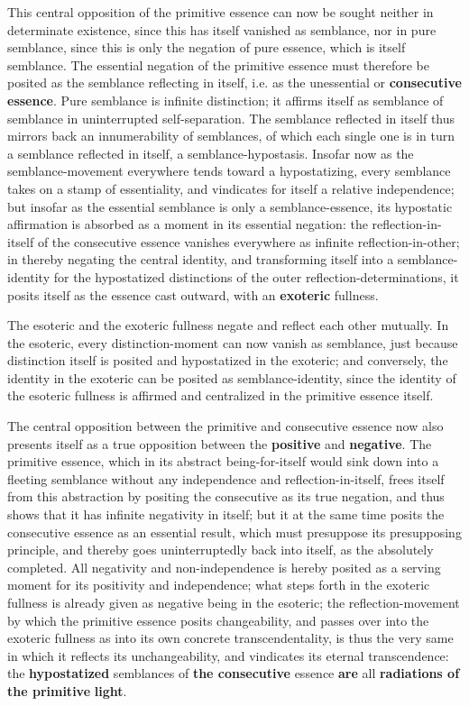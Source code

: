 \documentclass[12pt,a4paper,openany]{book}
\newcommand{\opage}[1]{\marginnote{\footnotesize\textit{[#1]}}}
\begin{document}
This central opposition of the primitive essence can now be sought neither in determinate existence, since this has itself vanished as semblance, nor in pure semblance, since this is only the negation of pure essence, which is itself semblance. The essential negation of the primitive essence must therefore be posited as the semblance reflecting in itself, i.e. as the unessential or \textbf{consecutive essence}.
\setcounter{footnote}{0}%
\opage{120}Pure semblance is infinite distinction; it affirms
itself as semblance of semblance in uninterrupted self-separation.
The semblance reflected in itself thus mirrors back
an innumerability of semblances, of which each single one
is in turn a semblance reflected in itself, a semblance-hypostasis.
Insofar now as the semblance-movement everywhere tends
toward a hypostatizing, every semblance takes on a stamp of essentiality,
and vindicates for itself a relative independence;
but insofar as the essential semblance
is only a semblance-essence, its hypostatic
affirmation is absorbed as a moment in its essential negation:
the reflection-in-itself of the consecutive essence vanishes
everywhere as infinite reflection-in-other;
in thereby negating the central identity, and
transforming itself into a semblance-identity for the hypostatized
distinctions of the outer reflection-determinations, it posits
itself as the essence cast outward, with an \textbf{exoteric}
fullness.

The esoteric and the exoteric fullness negate and
reflect each other mutually. In the esoteric,
every distinction-moment can now vanish as semblance,
just because distinction itself is posited and hypostatized
in the exoteric; and conversely, the identity in the
exoteric can be posited as semblance-identity, since the identity
of the esoteric fullness is affirmed and centralized
in the primitive essence itself.

The central opposition between the primitive and
consecutive essence now also presents itself as a
true opposition between the \textbf{positive} and \textbf{negative}.
The primitive essence, which in its abstract
being-for-itself would sink down into a fleeting semblance
without any independence and reflection-in-itself, frees
itself from this abstraction by positing
the consecutive as its true negation, and
\setcounter{footnote}{0}%
\opage{121}thus shows that it has infinite negativity in
itself; but it at the same time posits the consecutive essence
as an essential result, which must presuppose
its presupposing principle, and thereby goes uninterruptedly
back into itself, as the absolutely completed. All
negativity and non-independence is hereby posited as a
serving moment for its positivity and independence;
what steps forth in the exoteric fullness
is already given as negative being in the esoteric;
the reflection-movement by which the primitive
essence posits changeability, and passes over
into the exoteric fullness as into its own concrete
transcendentality, is thus the very same in which
it reflects its unchangeability, and vindicates its
eternal transcendence: the \textbf{hypostatized} semblances
of \textbf{the consecutive} essence \textbf{are} all \textbf{radiations
of the primitive} \textbf{light}.
\end{document}
